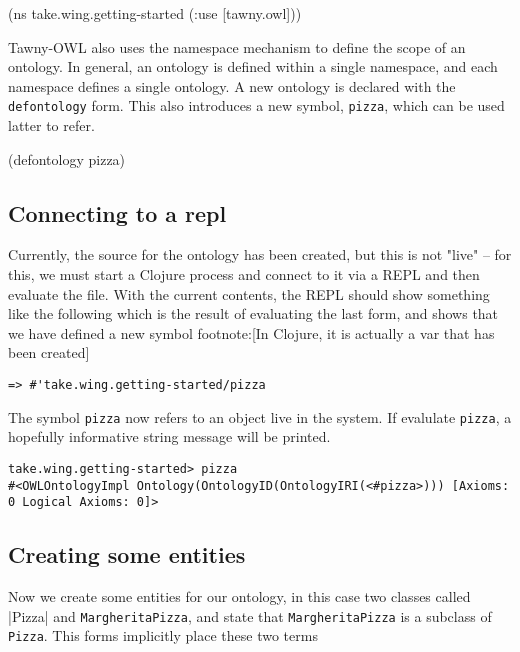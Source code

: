 \begin{tawny}
(ns take.wing.getting-started (:use [tawny.owl]))
\end{tawny}

Tawny-OWL also uses the namespace mechanism to define the scope of an
ontology. In general, an ontology is defined within a single namespace,
and each namespace defines a single ontology. A new ontology is declared
with the \texttt{defontology} form. This also introduces a new symbol, \texttt{pizza},
which can be used latter to refer.

\begin{tawny}
(defontology pizza)
\end{tawny}


\subsection{Connecting to a repl}
\label{sec-4-3}

Currently, the source for the ontology has been created, but this is not
"live" -- for this, we must start a Clojure process and connect to it
via a REPL and then evaluate the file. With the current contents, the
REPL should show something like the following which is the result of
evaluating the last form, and shows that we have defined a new symbol
footnote:[In Clojure, it is actually a var that has been created]

\begin{verbatim}
=> #'take.wing.getting-started/pizza
\end{verbatim}

The symbol \texttt{pizza} now refers to an object live in the system. If
evalulate \texttt{pizza}, a hopefully informative string message will be
printed.


\begin{verbatim}
take.wing.getting-started> pizza
#<OWLOntologyImpl Ontology(OntologyID(OntologyIRI(<#pizza>))) [Axioms: 0 Logical Axioms: 0]>
\end{verbatim}


\subsection{Creating some entities}
\label{sec-4-4}

Now we create some entities for our ontology, in this case two classes
called |Pizza| and \texttt{MargheritaPizza}, and state that \texttt{MargheritaPizza}
is a subclass of \texttt{Pizza}. This forms implicitly place these two terms


